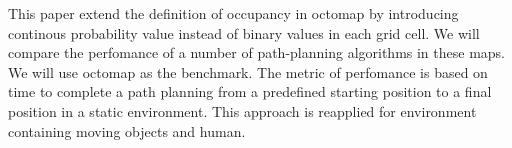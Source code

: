 \documentclass[a4paper,10pt]{article}
\begin{document}
This paper extend the definition of occupancy in octomap by introducing
continous probability value instead of binary values in each grid cell. 
We will compare
the perfomance of a number of path-planning algorithms in these maps. We will use octomap as the
benchmark. The metric of perfomance is based on time to complete a path planning
from a predefined starting position to a final position in a static environment.
This approach is reapplied for environment containing moving objects and human.


\end{document}
